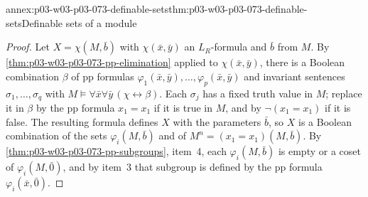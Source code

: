 \begin{annexitem}{annex:p03-w03-p03-073-definable-sets}{thm:p03-w03-p03-073-definable-sets}{Definable sets of a module}
\begin{proof}
Let \(X=\chi(M,\bar b)\) with \(\chi(\bar x,\bar y)\) an
\(L_R\)-formula and \(\bar b\) from \(M\). By
\cref{thm:p03-w03-p03-073-pp-elimination} applied to
\(\chi(\bar x,\bar y)\), there is a Boolean combination \(\beta\) of pp
formulas \(\varphi_1(\bar x,\bar y),\ldots,\varphi_p(\bar x,\bar y)\) and
invariant sentences \(\sigma_1,\ldots,\sigma_q\) with
\(M\models\forall\bar x\forall\bar y\,(\chi\leftrightarrow\beta)\). Each
\(\sigma_j\) has a fixed truth value in \(M\); replace it in \(\beta\) by
the pp formula \(x_1=x_1\) if it is true in \(M\), and by
\(\neg(x_1=x_1)\) if it is false. The resulting formula defines \(X\) with
the parameters \(\bar b\), so \(X\) is a Boolean combination of the sets
\(\varphi_i(M,\bar b)\) and of \(M^n=(x_1=x_1)(M,\bar b)\). By
\cref{thm:p03-w03-p03-073-pp-subgroups}, item~4, each
\(\varphi_i(M,\bar b)\) is empty or a coset of \(\varphi_i(M,\bar0)\), and
by item~3 that subgroup is defined by the pp formula
\(\varphi_i(\bar x,\bar 0)\).
\end{proof}
\end{annexitem}

